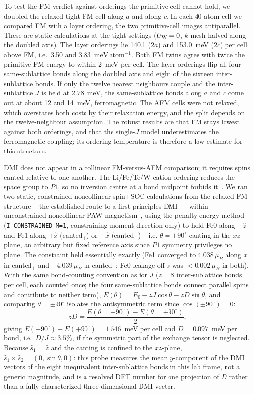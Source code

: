 \documentclass[aps,prb,preprint,superscriptaddress,longbibliography,nofootinbib]{revtex4-2}
\newcommand{\meVat}{\ensuremath{\mathrm{meV\,atom^{-1}}}}
\begin{document}
To test the FM verdict against orderings the primitive cell cannot hold, we doubled the relaxed tight FM cell along
$a$ and along $c$. In each 40-atom cell we compared FM with a layer ordering, the two primitive-cell images
antiparallel. These are static calculations at the tight settings ($U_{\rm W}=0$, $k$-mesh halved along the
doubled axis). The layer orderings lie 140.1 ($2a$) and 153.0~meV ($2c$) per cell above FM, i.e.\ 3.50 and
3.83~\meVat. Both FM twins agree with twice the primitive FM energy to within 2~meV per cell. The layer orderings flip all four
same-sublattice bonds along the doubled axis and eight of the sixteen inter-sublattice bonds. If only the twelve
nearest neighbours couple and the inter-sublattice $J$ is held at 2.78~meV, the same-sublattice bonds along $a$
and $c$ come out at about 12 and 14~meV, ferromagnetic. The AFM cells were not relaxed, which overstates both
costs by their relaxation energy, and the split depends on the twelve-neighbour assumption. The robust results
are that FM stays lowest against both orderings, and that the single-$J$ model underestimates the
ferromagnetic coupling; its ordering temperature is therefore a low estimate for this structure.

DMI does not appear in a collinear FM-versus-AFM comparison; it requires spins canted relative to one another.
The Li/Fe/Te/W cation ordering reduces the space group to $P1$, so no inversion centre at a bond midpoint
forbids it~\cite{moriya1960}. We ran two static, constrained noncollinear-spin+SOC calculations from the
relaxed FM structure -- the established route to a first-principles DMI~\cite{heide2008,freimuth2014} --
within unconstrained noncollinear PAW magnetism~\cite{hobbs2000}, using the penalty-energy
method~\cite{ma2015} (\texttt{I\_CONSTRAINED\_M=1}, constraining moment direction only) to hold Fe0 along
$+\hat{z}$ and Fe1 along $+\hat{x}$ (canted$_+$) or $-\hat{x}$ (canted$_-$) -- i.e. $\theta=\pm 90^\circ$
canting in the $xz$-plane, an arbitrary but fixed reference axis since $P1$ symmetry privileges no plane. The
constraint held essentially exactly (Fe1 converged to $4.038\,\mu_B$ along $x$ in canted$_+$ and
$-4.039\,\mu_B$ in canted$_-$; Fe0 leakage off $z$ was $<0.002\,\mu_B$ in both). With the same bond-counting
convention as for $J$ ($z=8$ inter-sublattice bonds per cell, each counted once; the four same-sublattice
bonds connect parallel spins and contribute to neither term), $E(\theta) = E_0 - zJ\cos\theta - zD\sin\theta$,
and comparing $\theta=\pm90^\circ$ isolates the antisymmetric term since $\cos(\pm90^\circ)=0$:
\begin{equation}
zD = \frac{E(\theta{=}-90^\circ) - E(\theta{=}+90^\circ)}{2},
\end{equation}
giving $E(-90^\circ)-E(+90^\circ)=1.546$~meV per cell and $D = 0.097$~meV per bond, i.e.\ $D/J \approx 3.5\%$,
if the symmetric part of the exchange tensor is neglected.
Because $\hat{s}_1=\hat{z}$ and the canting is confined to the $xz$-plane,
$\hat{s}_1\times\hat{s}_2 = (0,\sin\theta,0)$: this probe measures the mean $y$-component of the DMI vectors of
the eight inequivalent inter-sublattice bonds in this lab frame, not a generic magnitude, and is a resolved
DFT number for one projection of $D$ rather than a fully characterized three-dimensional DMI vector.
\end{document}
